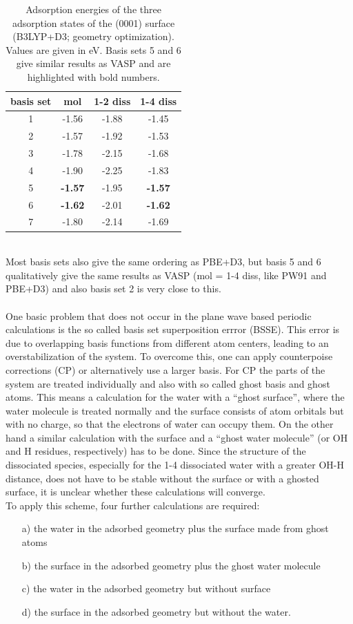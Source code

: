 \documentclass[11pt,DIV=13,BCOR=5mm,a4paper,headinclude]{scrbook}
\begin{document}
 \begin{table}[!h]
  \centering
   \caption{Adsorption energies of the three adsorption states of the (0001) surface (B3LYP+D3; geometry optimization).
Values are given in eV.
Basis sets 5 and 6 give similar results as VASP and are highlighted with bold numbers.}
  \begin{tabular}{c|ccc}
  \toprule
  basis set & mol & 1-2 diss & 1-4 diss \\\midrule
  1 &-1.56 &-1.88 &-1.45 \\
  2 &-1.57 &-1.92 &-1.53 \\
  3 &-1.78 &-2.15 &-1.68 \\
  4 &-1.90 &-2.25 &-1.83 \\
  5 &\textbf{-1.57} &-1.95 &\textbf{-1.57} \\
  6 &\textbf{-1.62} &-2.01 &\textbf{-1.62} \\
  7 &-1.80 &-2.14 &-1.69 \\\bottomrule
  \end{tabular}
  \label{tab:basisset-results-B3LYP+D3}
\end{table}
\\
Most basis sets also give the same ordering as PBE+D3, but basis 5 and 6 qualitatively give the same results as VASP (mol = 1-4 diss, like PW91 and PBE+D3) and also basis set 2 is very close to this.
\\
\\
One basic problem that does not occur in the plane wave based periodic calculations is the so called basis set superposition errror (BSSE).
This error is due to overlapping basis functions from different atom centers, leading to an overstabilization of the system.
To overcome this, one can apply counterpoise corrections (CP) or alternatively use a larger basis.
For CP the parts of the system are treated individually and also with so called ghost basis and ghost atoms.
This means a calculation for the water with a ``ghost surface'', where the water molecule is treated normally and the surface consists of atom orbitals but with no charge, so that the electrons of water can occupy them.
On the other hand a similar calculation with the surface and a ``ghost water molecule'' (or OH and H residues, respectively) has to be done.
Since the structure of the dissociated species, especially for the 1-4 dissociated water with a greater OH-H distance, does not have to be stable without the surface or with a ghosted surface, it is unclear whether these calculations will converge.
\\
To apply this scheme, four further calculations are required:
\begin{itemize}
 \item[a)] the water in the adsorbed geometry plus the surface made from ghost atoms
 \item[b)] the surface in the adsorbed geometry plus the ghost water molecule
 \item[c)] the water in the adsorbed geometry but without surface
 \item[d)] the surface in the adsorbed geometry but without the water.
\end{itemize}
\end{document}
